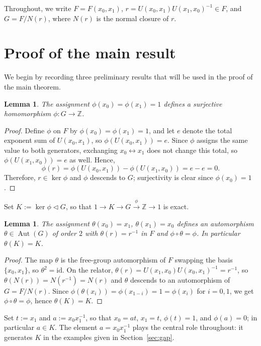 \documentclass[a4paper,12pt,oneside]{article}
\newtheorem{lemma}[theorem]{Lemma}
\theoremstyle{definition}
\DeclareMathOperator{\Aut}{Aut}
\begin{document}
\medskip
Throughout, we write $F=F(x_0,x_1)$, $r=U(x_0,x_1)U(x_1,x_0)^{-1}\in F$, and $G=F/N(r)$, where $N(r)$ is the normal closure of $r$.

\section{Proof of the main result}
\label{sec:proof}
We begin by recording three preliminary results that will be used in the proof of the main theorem.

\begin{lemma}\label{lem:phi}
The assignment $\phi(x_0)=\phi(x_1)=1$ defines a surjective homomorphism $\phi\colon G\to\mathbb{Z}$.
\end{lemma}

\begin{proof}
Define $\phi$ on $F$ by $\phi(x_0)=\phi(x_1)=1$, and let $e$ denote the total exponent sum of $U(x_0,x_1)$, so $\phi(U(x_0,x_1))=e$. Since $\phi$ assigns the same value to both generators, exchanging $x_0\leftrightarrow x_1$ does not change this total, so $\phi(U(x_1,x_0))=e$ as well. Hence,
$$\phi(r)=\phi(U(x_0,x_1))-\phi(U(x_1,x_0))=e-e=0.$$ Therefore, $r\in\ker\phi$ and $\phi$ descends to $G$; surjectivity is clear since $\phi(x_0)=1$.
\end{proof}

Set $K:=\ker\phi\lhd G$, so that $1\to K\to G\xrightarrow{\ \phi\ }\mathbb{Z}\to1$ is exact.

\begin{lemma}\label{lem:sigma}
The assignment $\theta(x_0)=x_1$, $\theta(x_1)=x_0$ defines an automorphism $\theta\in\Aut(G)$ of order $2$ with $\theta(r)=r^{-1}$ in $F$ and $\phi\circ\theta=\phi$. In particular $\theta(K)=K$.
\end{lemma}

\begin{proof}
The map $\theta$ is the free-group automorphism of $F$ swapping the basis $\{x_0,x_1\}$, so $\theta^2=\mathrm{id}$. On the relator, $\theta(r)=U(x_1,x_0)U(x_0,x_1)^{-1}=r^{-1}$, so $\theta(N(r))=N(r^{-1})=N(r)$ and $\theta$ descends to an automorphism of $G=F/N(r)$. Since $\phi(\theta(x_i))=\phi(x_{1-i})=1=\phi(x_i)$ for $i=0,1$, we get $\phi\circ\theta=\phi$, hence $\theta(K)=K$.
\end{proof}

Set $t:=x_1$ and $a:=x_0x_1^{-1}$, so that $x_0=at$, $x_1=t$, $\phi(t)=1$, and $\phi(a)=0$; in particular $a\in K$. The element $a=x_0x_1^{-1}$ plays the central role throughout: it generates $K$ in the examples given in Section~\ref{sec:gap}.
\end{document}
